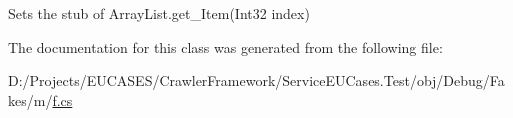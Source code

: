 Sets the stub of Array\-List.\-get\-\_\-\-Item(\-Int32 index)



The documentation for this class was generated from the following file\-:\begin{DoxyCompactItemize}
\item 
D\-:/\-Projects/\-E\-U\-C\-A\-S\-E\-S/\-Crawler\-Framework/\-Service\-E\-U\-Cases.\-Test/obj/\-Debug/\-Fakes/m/\hyperlink{m_2f_8cs}{f.\-cs}\end{DoxyCompactItemize}
